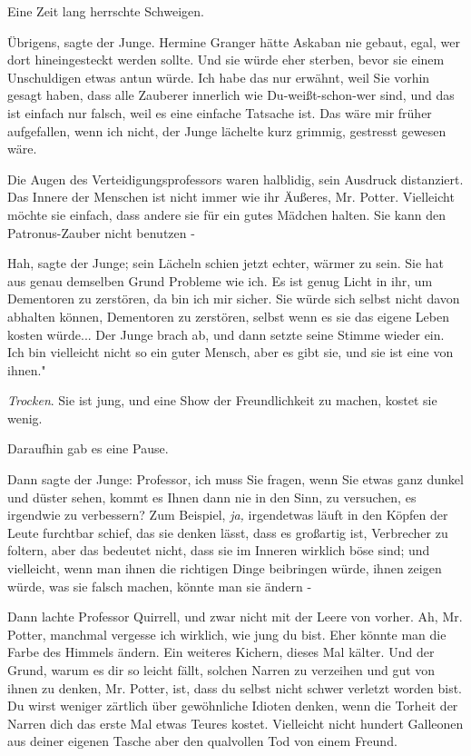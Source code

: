 Eine Zeit lang herrschte Schweigen.

\glqq Übrigens\grqq{}, sagte der Junge. \glqq Hermine Granger hätte Askaban nie
gebaut, egal, wer dort hineingesteckt werden sollte. Und sie würde eher sterben,
bevor sie einem Unschuldigen etwas antun würde. Ich habe das nur erwähnt, weil
Sie vorhin gesagt haben, dass alle Zauberer innerlich wie Du-weißt-schon-wer
sind, und das ist einfach nur falsch, weil es eine einfache Tatsache ist. Das
wäre mir früher aufgefallen, wenn ich nicht\grqq{}, der Junge lächelte kurz
grimmig, \glqq gestresst gewesen wäre.\grqq{}

Die Augen des Verteidigungsprofessors waren halblidig, sein Ausdruck
distanziert. \glqq Das Innere der Menschen ist nicht immer wie ihr Äußeres, Mr.
Potter. Vielleicht möchte sie einfach, dass andere sie für ein gutes Mädchen
halten. Sie kann den Patronus-Zauber nicht benutzen -\grqq{}

\glqq Hah\grqq{}, sagte der Junge; sein Lächeln schien jetzt echter, wärmer zu
sein. \glqq Sie hat aus genau demselben Grund Probleme wie ich. Es ist genug
Licht in ihr, um Dementoren zu zerstören, da bin ich mir sicher. Sie würde sich
selbst nicht davon abhalten können, Dementoren zu zerstören, selbst wenn es sie
das eigene Leben kosten würde...\grqq{} Der Junge brach ab, und dann setzte
seine Stimme wieder ein. \glqq Ich bin vielleicht nicht so ein guter Mensch,
aber es gibt sie, und sie ist eine von ihnen."

\emph{Trocken}. \glqq Sie ist jung, und eine Show der Freundlichkeit zu machen,
kostet sie wenig.\grqq{}

Daraufhin gab es eine Pause.

Dann sagte der Junge: \glqq Professor, ich muss Sie fragen, wenn Sie etwas ganz
dunkel und düster sehen, kommt es Ihnen dann nie in den Sinn, zu versuchen, es
irgendwie zu verbessern? Zum Beispiel,\emph{ ja,} irgendetwas läuft in den
Köpfen der Leute furchtbar schief, das sie denken lässt, dass es großartig ist,
Verbrecher zu foltern, aber das bedeutet nicht, dass sie im Inneren wirklich
böse sind; und vielleicht, wenn man ihnen die richtigen Dinge beibringen würde,
ihnen zeigen würde, was sie falsch machen, könnte man sie ändern -\grqq{}

Dann lachte Professor Quirrell, und zwar nicht mit der Leere von vorher. \glqq
Ah, Mr. Potter, manchmal vergesse ich wirklich, wie jung du bist. Eher könnte
man die Farbe des Himmels ändern.\grqq{} Ein weiteres Kichern, dieses Mal
kälter. \glqq Und der Grund, warum es dir so leicht fällt, solchen Narren zu
verzeihen und gut von ihnen zu denken, Mr. Potter, ist, dass du selbst nicht
schwer verletzt worden bist. Du wirst weniger zärtlich über gewöhnliche Idioten
denken, wenn die Torheit der Narren dich das erste Mal etwas Teures kostet.
Vielleicht nicht hundert Galleonen aus deiner eigenen Tasche aber den qualvollen
Tod von einem Freund.\grqq{}

